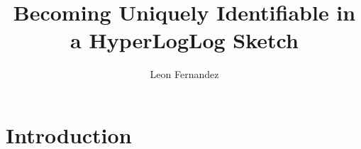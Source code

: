 \documentclass[manuscript,nonacm=true]{acmart}
\begin{document}
\title{Becoming Uniquely Identifiable in a HyperLogLog Sketch}

\author{Leon Fernandez}
\orcid{}



\maketitle

\section{Introduction}
\label{sec:introduction}


%
%
\end{document}

